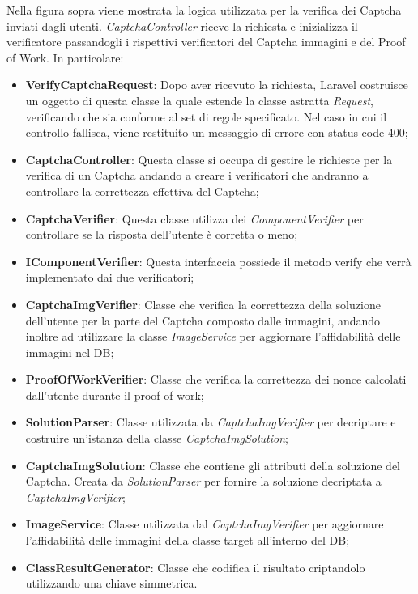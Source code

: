 Nella figura sopra viene mostrata la logica utilizzata per la verifica dei Captcha inviati dagli utenti. \textit{CaptchaController} riceve la richiesta e inizializza il verificatore passandogli i rispettivi verificatori del Captcha immagini e del Proof of Work.
In particolare:
\begin{itemize}
	\item \textbf{VerifyCaptchaRequest}: Dopo aver ricevuto la richiesta, Laravel costruisce un oggetto di questa classe la quale estende la classe astratta \textit{Request}, verificando che sia conforme al set di regole specificato. Nel caso in cui il controllo fallisca, viene restituito un messaggio di errore con status code 400;
	\item \textbf{CaptchaController}: Questa classe si occupa di gestire le richieste per la verifica di un Captcha andando a creare i verificatori che andranno a controllare la correttezza effettiva del Captcha;
	\item \textbf{CaptchaVerifier}: Questa classe utilizza dei \textit{ComponentVerifier} per controllare se la risposta dell'utente è corretta o meno;
	\item \textbf{IComponentVerifier}: Questa interfaccia possiede il metodo verify che verrà implementato dai due verificatori; 
	\item \textbf{CaptchaImgVerifier}: Classe che verifica la correttezza della soluzione dell'utente per la parte del Captcha composto dalle immagini, andando inoltre ad utilizzare la classe \textit{ImageService} per aggiornare l'affidabilità delle immagini nel DB;
	\item \textbf{ProofOfWorkVerifier}: Classe che verifica la correttezza dei nonce calcolati dall'utente durante il proof of work;
	\item \textbf{SolutionParser}: Classe utilizzata da \textit{CaptchaImgVerifier} per decriptare e costruire un'istanza della classe \textit{CaptchaImgSolution};
	\item \textbf{CaptchaImgSolution}: Classe che contiene gli attributi della soluzione del Captcha. Creata da \textit{SolutionParser} per fornire la soluzione decriptata a \textit{CaptchaImgVerifier};
	\item \textbf{ImageService}: Classe utilizzata dal \textit{CaptchaImgVerifier} per aggiornare l'affidabilità delle immagini della classe target all'interno del DB;
	\item \textbf{ClassResultGenerator}: Classe che codifica il risultato criptandolo utilizzando una chiave simmetrica.
\end{itemize}

